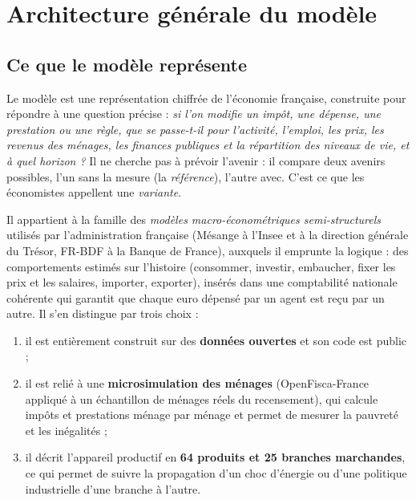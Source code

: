 \chapter{Architecture générale du modèle}
\label{ch:architecture}

\section{Ce que le modèle représente}

Le modèle est une représentation chiffrée de l'économie française, construite pour répondre à une question précise :
\emph{si l'on modifie un impôt, une dépense, une prestation ou une règle, que se passe-t-il pour l'activité, l'emploi,
les prix, les revenus des ménages, les finances publiques et la répartition des niveaux de vie, et à quel horizon ?}
Il ne cherche pas à prévoir l'avenir : il compare deux avenirs possibles, l'un sans la mesure (la \emph{référence}),
l'autre avec. C'est ce que les économistes appellent une \emph{variante}.

Il appartient à la famille des \emph{modèles macro-économétriques semi-structurels} utilisés par l'administration
française (Mésange à l'Insee et à la direction générale du Trésor, FR-BDF à la Banque de France), auxquels il emprunte
la logique : des comportements estimés sur l'histoire (consommer, investir, embaucher, fixer les prix et les salaires,
importer, exporter), insérés dans une comptabilité nationale cohérente qui garantit que chaque euro dépensé par un agent
est reçu par un autre. Il s'en distingue par trois choix :
\begin{enumerate}
  \item il est entièrement construit sur des \textbf{données ouvertes} et son code est public ;
  \item il est relié à une \textbf{microsimulation des ménages} (OpenFisca-France appliqué à un échantillon de ménages
  réels du recensement), qui calcule impôts et prestations ménage par ménage et permet de mesurer la pauvreté et les
  inégalités ;
  \item il décrit l'appareil productif en \textbf{64 produits et 25 branches marchandes}, ce qui permet de suivre la
  propagation d'un choc d'énergie ou d'une politique industrielle d'une branche à l'autre.
\end{enumerate}

